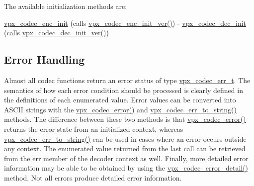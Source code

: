 The available initialization methods are\-:
\begin{DoxyItemize}
\item \hyperlink{group__encoder_ga3d490a2a9a6acd7c9ef82a603155f3cf}{vpx\-\_\-codec\-\_\-enc\-\_\-init} (calls \hyperlink{group__encoder_ga6ed21b96c481c0b6e1b543ef958a57a4}{vpx\-\_\-codec\-\_\-enc\-\_\-init\-\_\-ver()}) -\/ \hyperlink{group__decoder_ga8c2f0b12f1bd4927eb3c68b01eab19d3}{vpx\-\_\-codec\-\_\-dec\-\_\-init} (calls \hyperlink{group__decoder_ga26fe82cf8fd697f885935cea53be964f}{vpx\-\_\-codec\-\_\-dec\-\_\-init\-\_\-ver()})
\end{DoxyItemize}\hypertarget{usage_usage_errors}{}\subsection{Error Handling}\label{usage_usage_errors}
Almost all codec functions return an error status of type \hyperlink{group__codec_gada1084710837ad363b92f2379dd2b8d2}{vpx\-\_\-codec\-\_\-err\-\_\-t}. The semantics of how each error condition should be processed is clearly defined in the definitions of each enumerated value. Error values can be converted into A\-S\-C\-I\-I strings with the \hyperlink{group__codec_ga4d265df00d42b36a4f0e3eb83fc22c5e}{vpx\-\_\-codec\-\_\-error()} and \hyperlink{group__codec_gaaddf5c1f609ef18c7c8800d102fcefa6}{vpx\-\_\-codec\-\_\-err\-\_\-to\-\_\-string()} methods. The difference between these two methods is that \hyperlink{group__codec_ga4d265df00d42b36a4f0e3eb83fc22c5e}{vpx\-\_\-codec\-\_\-error()} returns the error state from an initialized context, whereas \hyperlink{group__codec_gaaddf5c1f609ef18c7c8800d102fcefa6}{vpx\-\_\-codec\-\_\-err\-\_\-to\-\_\-string()} can be used in cases where an error occurs outside any context. The enumerated value returned from the last call can be retrieved from the {\ttfamily err} member of the decoder context as well. Finally, more detailed error information may be able to be obtained by using the \hyperlink{group__codec_ga29273cb552ed1a437fe263c4a0a54300}{vpx\-\_\-codec\-\_\-error\-\_\-detail()} method. Not all errors produce detailed error information.

